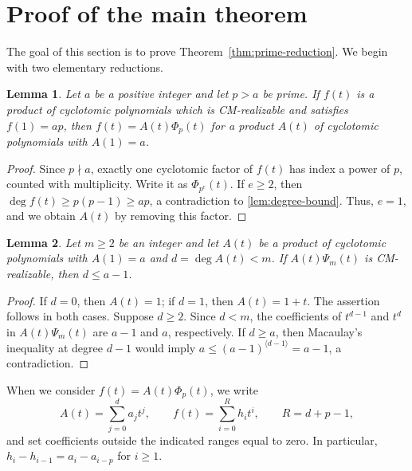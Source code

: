 \documentclass[11pt,a4paper]{amsart}
\newtheorem{lemma}[lemma]{Lemma}
\theoremstyle{definition}
\theoremstyle{remark}
\begin{document}
\section{Proof of the main theorem}\label{sec:prime-proof}
The goal of this section is to prove Theorem~\ref{thm:prime-reduction}. We begin with two elementary reductions.
\begin{lemma}\label{lem:p-primary-factor}
Let $a$ be a positive integer and let $p>a$ be prime. If $f(t)$ is a product of cyclotomic polynomials which is CM-realizable and satisfies $f(1)=ap$, then $f(t)=A(t)\Phi_p(t)$ for a product $A(t)$ of cyclotomic polynomials with $A(1)=a$.
\end{lemma}
\begin{proof}
Since $p\nmid a$, exactly one cyclotomic factor of $f(t)$ has index a power of $p$, counted with multiplicity. Write it as $\Phi_{p^e}(t)$. If $e\ge2$, then $\deg f(t)\ge p(p-1)\ge ap$, a contradiction to \cref{lem:degree-bound}. Thus, $e=1$, and we obtain $A(t)$ by removing this factor.
\end{proof}

\begin{lemma}\label{lem:small-degree-A}
Let $m\ge2$ be an integer and let $A(t)$ be a product of cyclotomic polynomials with $A(1)=a$ and $d=\deg A(t)<m$. If $A(t)\Psi_m(t)$ is CM-realizable, then $d\le a-1$.
\end{lemma}
\begin{proof}
If $d=0$, then $A(t)=1$; if $d=1$, then $A(t)=1+t$. The assertion follows in both cases. Suppose $d\ge2$. Since $d<m$, the coefficients of $t^{d-1}$ and $t^d$ in $A(t)\Psi_m(t)$ are $a-1$ and $a$, respectively. If $d\ge a$, then Macaulay's inequality at degree $d-1$ would imply $a\le(a-1)^{\langle d-1\rangle}=a-1$, a contradiction.
\end{proof}

When we consider $f(t)=A(t)\Phi_p(t)$, we write
\begin{equation}\label{eq:A-f-notation}
A(t)=\sum_{j=0}^d a_jt^j,\qquad f(t)=\sum_{i=0}^R h_it^i,\qquad R=d+p-1,
\end{equation}
and set coefficients outside the indicated ranges equal to zero. In particular, $h_i-h_{i-1}=a_i-a_{i-p}$ for $i\ge1$.
\end{document}
